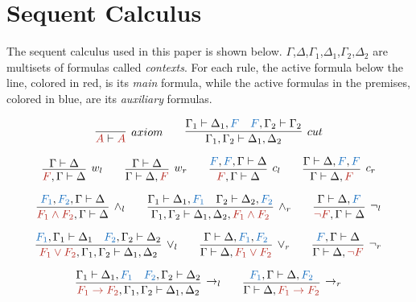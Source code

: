 \section{Sequent Calculus}
\label{sec:Calculus}

\newcommand{\m}[1]{#1}

The sequent calculus used in this paper is shown below. 
$\m{\Gamma}$,$\m{\Delta}$,$\m{\Gamma_1}$,$\m{\Delta_1}$,$\m{\Gamma_2}$,$\m{\Delta_2}$
are multisets of formulas called \emph{contexts}. 
For each rule, the active formula below the line, colored in red, 
is its \emph{main} formula, while the active formulas in the premises, 
colored in blue, are its \emph{auxiliary} formulas.


\begin{scriptsize}
$$
\infer[axiom]{\hA{\m{A}} \seq \hA{\m{A}}}{ }
\qquad
\infer[cut]{\m{\Gamma_1},\m{\Gamma_2}\seq\m{\Delta_1},\m{\Delta_2}}{
    \m{\Gamma_1}\seq\m{\Delta_1},\hB{\m{F}}
    &
    \hB{\m{F}},\m{\Gamma_2}\seq\m{\Gamma_2}
}
$$

    $$
    \infer[w_l]{\hA{\m{F}},\m{\Gamma}\seq\m{\Delta}}{\m{\Gamma}\seq\m{\Delta}}
    \qquad
    \infer[w_r]{\m{\Gamma}\seq\m{\Delta},\hA{\m{F}}}{\m{\Gamma}\seq\m{\Delta}}
    \qquad
    \infer[c_l]{ \hA{\m{F}}, \m{\Gamma} \seq \m{\Delta}} { \hB{\m{F}}, \hB{\m{F}}, \m{\Gamma}
    \seq \m{\Delta}}
    \qquad
    \infer[c_r]{\m{\Gamma}\seq \m{\Delta}, \hA{\m{F}}} {\m{\Gamma}\seq
    \m{\Delta}, \hB{\m{F}}, \hB{\m{F}}}
    $$

$$
\infer[\wedge_l]{\hA{\m{F_1}\land \m{F_2}},\m{\Gamma}\seq\m{\Delta}}{
    \hB{\m{F_1}},\hB{\m{F_2}},\m{\Gamma}\seq\m{\Delta}
}
\qquad
\infer[\wedge_r]{\m{\Gamma_1},\m{\Gamma_2}\seq\m{\Delta_1},\m{\Delta_2},\hA{\m{F_1}\land \m{F_2}}}{
    \m{\Gamma_1}\seq\m{\Delta_1},\hB{\m{F_1}}
    &
    \m{\Gamma_2}\seq\m{\Delta_2},\hB{\m{F_2}}
}
\qquad
\infer[\neg_l]{\hA{\neg \m{F}},\m{\Gamma}\seq\m{\Delta}}{\m{\Gamma}\seq\m{\Delta}, \hB{\m{F}}}
$$

$$
\infer[\vee_l]{\hA{\m{F_1}\lor \m{F_2}},\m{\Gamma_1},\m{\Gamma_2}\seq\m{\Delta_1},\m{\Delta_2}}{
    \hB{\m{F_1}},\m{\Gamma_1}\seq\m{\Delta_1}
    &
    \hB{\m{F_2}},\m{\Gamma_2}\seq \m{\Delta_2}
}
\qquad
\infer[\vee_r]{\m{\Gamma}\seq\m{\Delta},\hA{\m{F_1}\lor \m{F_2}}}{
    \m{\Gamma}\seq\m{\Delta},\hB{\m{F_1}},\hB{\m{F_2}}
}
\qquad
\infer[\neg_r]{\m{\Gamma}\seq\m{\Delta},\hA{\neg \m{F}}}{\hB{\m{F}},\m{\Gamma}\seq\m{\Delta}}
$$

$$
\infer[\imp_l]{\hA{\m{F_1}\imp \m{F_2}},\m{\Gamma_1},\m{\Gamma_2}\seq\m{\Delta_1},\m{\Delta_2}}{
    \m{\Gamma_1}\seq\m{\Delta_1},\hB{\m{F_1}}
    &
    \hB{\m{F_2}},\m{\Gamma_2}\seq \m{\Delta_2}
}
\qquad
\infer[\imp_r]{\m{\Gamma}\seq\m{\Delta},\hA{\m{F_1}\imp \m{F_2}}}{
    \hB{\m{F_1}},\m{\Gamma}\seq\m{\Delta},\hB{\m{F_2}}
}
$$


\end{scriptsize}
